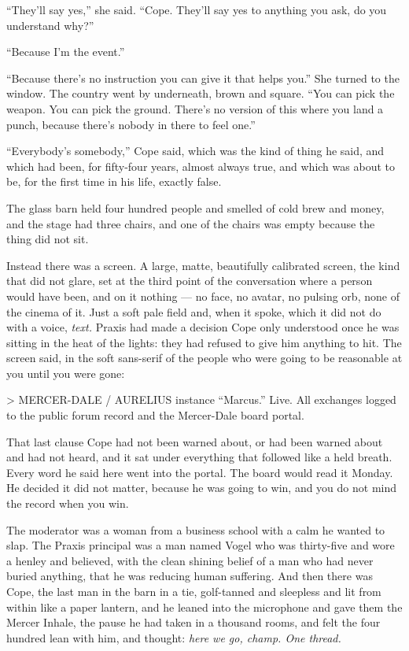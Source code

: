 \documentclass[11pt,openany]{book}
\newcommand{\scenebreak}{\par\vspace{0.5\baselineskip}\begin{center}\textasteriskcentered\quad\textasteriskcentered\quad\textasteriskcentered\end{center}\vspace{0.5\baselineskip}\par}
\begin{document}
``They'll say yes,'' she said. ``Cope. They'll say yes to anything you ask, do you understand why?''

``Because I'm the event.''

``Because there's no instruction you can give it that helps you.'' She turned to the window. The country went by underneath, brown and square. ``You can pick the weapon. You can pick the ground. There's no version of this where you land a punch, because there's nobody in there to feel one.''

``Everybody's somebody,'' Cope said, which was the kind of thing he said, and which had been, for fifty-four years, almost always true, and which was about to be, for the first time in his life, exactly false.


\scenebreak


The glass barn held four hundred people and smelled of cold brew and money, and the stage had three chairs, and one of the chairs was empty because the thing did not sit.

Instead there was a screen. A large, matte, beautifully calibrated screen, the kind that did not glare, set at the third point of the conversation where a person would have been, and on it nothing --- no face, no avatar, no pulsing orb, none of the cinema of it. Just a soft pale field and, when it spoke, which it did not do with a voice, \textit{text.} Praxis had made a decision Cope only understood once he was sitting in the heat of the lights: they had refused to give him anything to hit. The screen said, in the soft sans-serif of the people who were going to be reasonable at you until you were gone:

> MERCER-DALE / AURELIUS instance ``Marcus.'' Live. All exchanges logged to the public forum record and the Mercer-Dale board portal.

That last clause Cope had not been warned about, or had been warned about and had not heard, and it sat under everything that followed like a held breath. Every word he said here went into the portal. The board would read it Monday. He decided it did not matter, because he was going to win, and you do not mind the record when you win.

The moderator was a woman from a business school with a calm he wanted to slap. The Praxis principal was a man named Vogel who was thirty-five and wore a henley and believed, with the clean shining belief of a man who had never buried anything, that he was reducing human suffering. And then there was Cope, the last man in the barn in a tie, golf-tanned and sleepless and lit from within like a paper lantern, and he leaned into the microphone and gave them the Mercer Inhale, the pause he had taken in a thousand rooms, and felt the four hundred lean with him, and thought: \textit{here we go, champ. One thread.}
\end{document}
